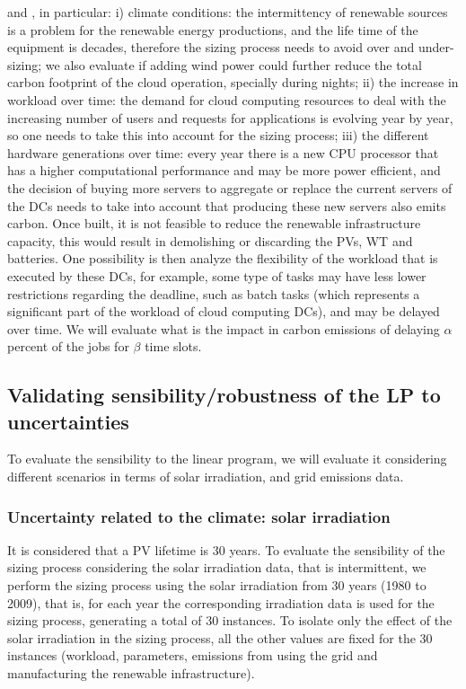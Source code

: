 and , in particular: i) climate conditions: the intermittency of renewable sources is a  problem for the renewable energy productions, and the life time of the equipment is decades, therefore the sizing process needs to avoid over and under-sizing; we also evaluate if adding wind power could further reduce the total carbon footprint of the cloud operation, specially during nights; ii) the increase in workload over time: the demand for cloud computing resources to deal with the increasing number of users and requests for applications is evolving year by year, so one needs to take this into account for the sizing process; iii) the different hardware generations over time: every year there is a new CPU processor that has a higher computational performance and may be more power efficient, and the decision of buying more servers to aggregate or replace the current servers of the DCs needs to take into account that producing these new servers also emits carbon.  Once built, it is not feasible to reduce the renewable infrastructure capacity, this would result in demolishing or discarding the PVs, WT and batteries. One possibility is then analyze the flexibility of the workload that is executed by these DCs, for example, some type of tasks may have less lower restrictions regarding the deadline, such as batch tasks (which represents a significant part of the workload of cloud computing DCs), and may be delayed over time. We will evaluate what is the impact in carbon emissions of delaying $\alpha$ percent of the jobs for $\beta$ time slots.

\subsection{Validating sensibility/robustness of the LP to uncertainties}

To evaluate the sensibility to the linear program, we will evaluate it considering different scenarios in terms of solar irradiation, and grid emissions data.

\subsubsection{Uncertainty related to the climate: solar irradiation}

It is considered that a PV lifetime is 30 years. To evaluate the sensibility of the sizing process considering the solar irradiation data, that is intermittent, we perform the sizing process using the solar irradiation from 30 years (1980 to 2009), that is, for each year the corresponding irradiation data is used for the sizing process, generating a total of 30 instances. To isolate only the effect of the solar irradiation in the sizing process, all the other values are fixed for the 30 instances (workload, parameters,  emissions from using the grid and manufacturing the renewable infrastructure).

